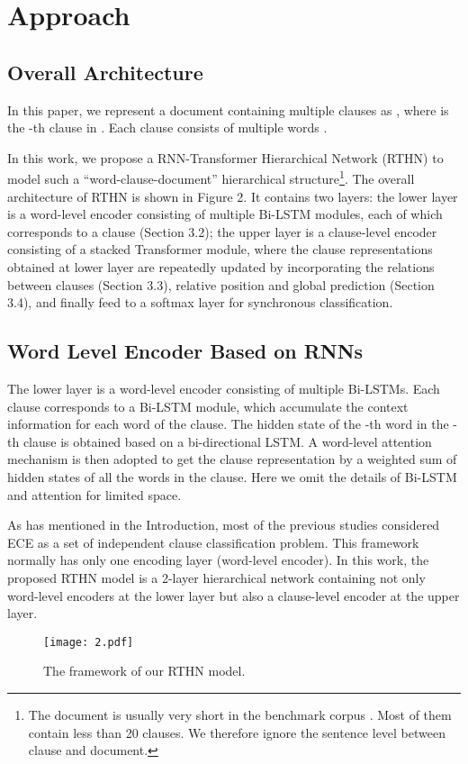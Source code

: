 \documentclass{article}
\begin{document}
\section{Approach}
\subsection{Overall Architecture}
In this paper, we represent a document containing multiple clauses as , where  is the -th clause in . Each clause  consists of multiple words .

In this work, we propose a RNN-Transformer Hierarchical Network (RTHN) to model such a “word-clause-document” hierarchical structure\footnote{The document is usually very short in the benchmark corpus \cite{gui2016event}. Most of them contain less than 20 clauses. We therefore ignore the sentence level between clause and document.}. The overall architecture of RTHN is shown in Figure 2. It contains two layers: the lower layer is a word-level encoder consisting of multiple Bi-LSTM modules, each of which corresponds to a clause (Section 3.2); the upper layer is a clause-level encoder consisting of a stacked Transformer module, where the clause representations obtained at lower layer are repeatedly updated by incorporating the relations between clauses (Section 3.3), relative position and global prediction (Section 3.4), and finally feed to a softmax layer for synchronous classification.

\subsection{Word Level Encoder Based on RNNs}
The lower layer is a word-level encoder consisting of multiple Bi-LSTMs. Each clause corresponds to a Bi-LSTM module, which accumulate the context information for each word of the clause. The hidden state of the -th word in the -th clause  is obtained based on a bi-directional LSTM. A word-level attention mechanism is then adopted to get the clause representation  by a weighted sum of hidden states of all the words in the clause. Here we omit the details of Bi-LSTM and attention for limited space.

As has mentioned in the Introduction, most of the previous studies considered ECE as a set of independent clause classification problem. This framework normally has only one encoding layer (word-level encoder). In this work, the proposed RTHN model is a 2-layer hierarchical network containing not only word-level encoders at the lower layer but also a clause-level encoder at the upper layer.
\begin{figure}[!t]
\centering
\texttt{[image: 2.pdf]}
\caption{The framework of our RTHN model.}
\label{fig_sim1}
\end{figure}
\end{document}
